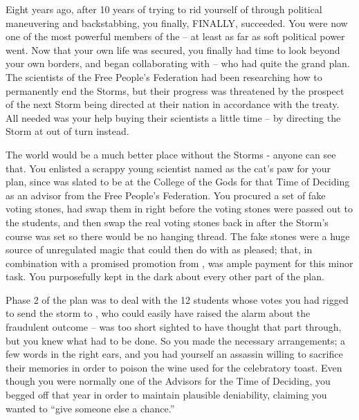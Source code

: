 \documentclass[char]{GL2020}
\begin{document}
Eight years ago, after 10 years of trying to rid yourself of \cEvilNemesis{} through political maneuvering and backstabbing, you finally, FINALLY, succeeded. You were now one of the most powerful members of the \pFarm{} -- at least as far as soft political power went. Now that your own life was secured, you finally had time to look beyond your own borders, and began collaborating with \cDiplomat{\full} -- who had quite the grand plan. The scientists of the Free People's Federation had been researching how to permanently end the Storms, but their progress was threatened by the prospect of the next Storm being directed at their nation in accordance with the treaty. All \cDiplomat{} needed was your help buying their scientists a little time – by directing the Storm at \pShip{} out of turn instead. 

The world would be a much better place without the Storms - anyone can see that. You enlisted a scrappy young scientist named \cHeadScientist{\full} as the cat's paw for your plan, since \cHeadScientist{\they} was slated to be at the College of the Gods for that Time of Deciding as an advisor from the Free People's Federation. You procured a set of fake voting stones, had  \cHeadScientist{} swap them in right before the voting stones were passed out to the students, and then swap the real voting stones back in after the Storm's course was set so there would be no hanging thread. The fake stones were a huge source of unregulated magic that \cHeadScientist{} could then do with as \cHeadScientist{\they} pleased; that, in combination with a promised promotion from \cDiplomat{}, was ample payment for this minor task. You purposefully kept \cHeadScientist{} in the dark about every other part of the plan. 

Phase 2 of the plan was to deal with the 12 students whose votes you had rigged to send the storm to \pShip{}, who could easily have raised the alarm about the fraudulent outcome – \cDiplomat{} was too short sighted to have thought that part through, but you knew what had to be done. So you made the necessary arrangements; a few words in the right ears, and you had yourself an assassin willing to sacrifice their memories in order to poison the wine used for the celebratory toast. Even though you were normally one of the Advisors for the Time of Deciding, you begged off that year in order to maintain plausible deniability, claiming you wanted to ``give someone else a chance.'' 
\end{document}
